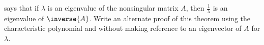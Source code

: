  says that if $\lambda$ is an eigenvalue of the nonsingular matrix $A$, then $\frac{1}{\lambda}$ is an eigenvalue of $\inverse{A}$.  Write an alternate proof of this theorem using the characteristic polynomial and without making reference to an eigenvector of $A$ for $\lambda$.
